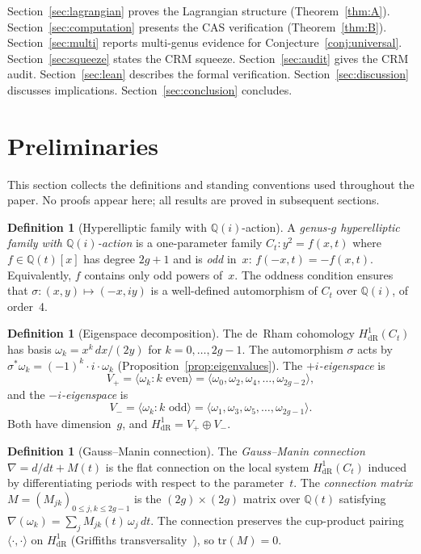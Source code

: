 \documentclass[11pt]{article}
\theoremstyle{plain}
\theoremstyle{definition}
\newtheorem{definition}[theorem]{Definition}
\theoremstyle{remark}
\newcommand{\Q}{\mathbb{Q}}
\newcommand{\tr}{\mathrm{tr}}
\newcommand{\HdR}{H^1_{\mathrm{dR}}}
\begin{document}
Section~\ref{sec:lagrangian} proves the Lagrangian structure
(Theorem~\ref{thm:A}).
Section~\ref{sec:computation} presents the CAS verification
(Theorem~\ref{thm:B}).
Section~\ref{sec:multi} reports multi-genus evidence for
Conjecture~\ref{conj:universal}.
Section~\ref{sec:squeeze} states the CRM squeeze.
Section~\ref{sec:audit} gives the CRM audit.
Section~\ref{sec:lean} describes the formal verification.
Section~\ref{sec:discussion} discusses implications.
Section~\ref{sec:conclusion} concludes.

\section{Preliminaries}\label{sec:prelim}

This section collects the definitions and standing conventions used
throughout the paper.  No proofs appear here; all results are proved in
subsequent sections.

\begin{definition}[Hyperelliptic family with $\Q(i)$-action]\label{def:family}
A \emph{genus-$g$ hyperelliptic family with $\Q(i)$-action} is a
one-parameter family $C_t\colon y^2 = f(x,t)$ where $f \in \Q(t)[x]$
has degree $2g+1$ and is \emph{odd} in~$x$: $f(-x,t) = -f(x,t)$.
Equivalently, $f$ contains only odd powers of~$x$.  The oddness
condition ensures that $\sigma\colon (x,y) \mapsto (-x, iy)$ is a
well-defined automorphism of $C_t$ over $\Q(i)$, of order~4.
\end{definition}

\begin{definition}[Eigenspace decomposition]\label{def:eigenspaces}
The de~Rham cohomology $\HdR(C_t)$ has basis
$\omega_k = x^k\, dx/(2y)$ for $k = 0,\ldots,2g-1$.  The automorphism
$\sigma$ acts by $\sigma^*\omega_k = (-1)^k \cdot i \cdot \omega_k$
(Proposition~\ref{prop:eigenvalues}).  The \emph{$+i$-eigenspace} is
\[
  V_+ = \langle \omega_k : k \text{ even} \rangle
  = \langle \omega_0, \omega_2, \omega_4, \ldots, \omega_{2g-2} \rangle,
\]
and the \emph{$-i$-eigenspace} is
\[
  V_- = \langle \omega_k : k \text{ odd} \rangle
  = \langle \omega_1, \omega_3, \omega_5, \ldots, \omega_{2g-1} \rangle.
\]
Both have dimension~$g$, and $\HdR = V_+ \oplus V_-$.
\end{definition}

\begin{definition}[Gauss--Manin connection]\label{def:GM}
The \emph{Gauss--Manin connection} $\nabla = d/dt + M(t)$ is the
flat connection on the local system $\HdR(C_t)$ induced by
differentiating periods with respect to the parameter~$t$.  The
\emph{connection matrix} $M = (M_{jk})_{0 \le j,k \le 2g-1}$ is
the $(2g) \times (2g)$ matrix over $\Q(t)$ satisfying
$\nabla(\omega_k) = \sum_j M_{jk}(t)\, \omega_j\, dt$.
The connection preserves the cup-product pairing
$\langle\cdot,\cdot\rangle$ on $\HdR$
(Griffiths transversality~\cite{Griffiths1969}), so $\tr(M) = 0$.
\end{definition}
\end{document}
